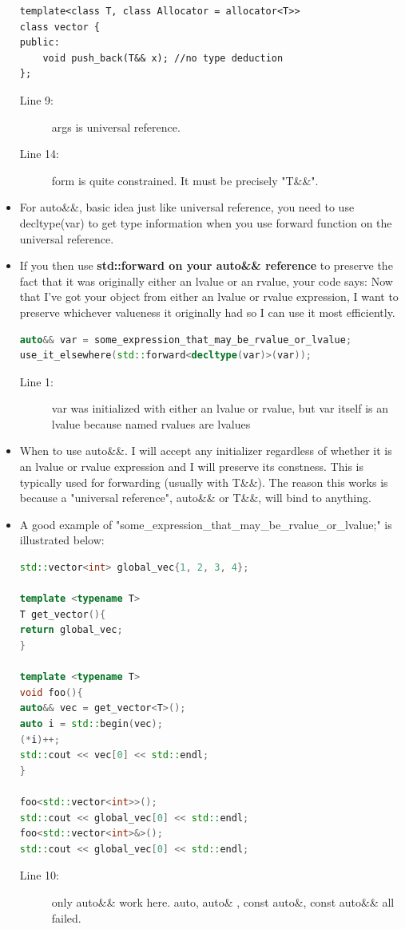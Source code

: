 \documentclass[a4paper,11pt,twoside]{book}
\begin{document}
\begin{itemize}
\begin{lstlisting}
template<class T, class Allocator = allocator<T>>
class vector { 
public:
	void push_back(T&& x); //no type deduction
};
\end{lstlisting}
\begin{description}
	\item[Line 9:] args is universal reference.
	\item[Line 14:] form is quite constrained. It must be precisely "T\&\&".
\end{description}

\item For auto\&\&, basic idea just like universal reference, you need to use decltype(var) to get type information when you use forward function on the universal reference. 

\item If you then use \textbf{std::forward on your auto\&\& reference} to preserve the fact that it was originally either an lvalue or an rvalue, your code says: Now that I've got your object from either an lvalue or rvalue expression, I want to preserve whichever valueness it originally had so I can use it most efficiently.

\begin{lstlisting}[frame=single, language=c++]
auto&& var = some_expression_that_may_be_rvalue_or_lvalue;
use_it_elsewhere(std::forward<decltype(var)>(var));
\end{lstlisting}
\begin{description}
	\item[Line 1:] var was initialized with either an lvalue or rvalue, but var itself is an lvalue because named rvalues are lvalues
\end{description}

\item When to use auto\&\&. I will accept any initializer regardless of whether it is an lvalue or rvalue expression and I will preserve its constness. This is typically used for forwarding (usually with T\&\&). The reason this works is because a "universal reference", auto\&\& or T\&\&, will bind to anything. 

\item A good example of "some\_expression\_that\_may\_be\_rvalue\_or\_lvalue;" is illustrated below:
\begin{lstlisting}[frame=single, language=c++]
std::vector<int> global_vec{1, 2, 3, 4};

template <typename T>
T get_vector(){
return global_vec;
}

template <typename T>
void foo(){
auto&& vec = get_vector<T>(); 
auto i = std::begin(vec);
(*i)++;
std::cout << vec[0] << std::endl;
}

foo<std::vector<int>>();
std::cout << global_vec[0] << std::endl;
foo<std::vector<int>&>();
std::cout << global_vec[0] << std::endl;
\end{lstlisting}
\begin{description}
	\item[Line 10:] only auto\&\& work here. auto, auto\& , const auto\&, const auto\&\& all failed.
\end{description}

\end{itemize}
\end{document}
